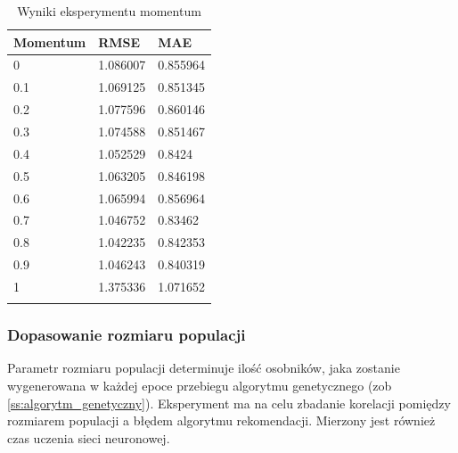 \documentclass[twoside]{iisthesis}
\begin{document}
		\begin{longtable}{l||ll}
			\label{tab:expmomentum}
			\textbf{Momentum} & \textbf{RMSE} & \textbf{MAE} \\
			\hline
			0        & 1.086007 & 0.855964 \\
			0.1      & 1.069125 & 0.851345 \\
			0.2      & 1.077596 & 0.860146 \\
			0.3      & 1.074588 & 0.851467 \\
			0.4      & 1.052529 & 0.8424   \\
			0.5      & 1.063205 & 0.846198 \\
			0.6      & 1.065994 & 0.856964 \\
			0.7      & 1.046752 & 0.83462  \\
			0.8      & 1.042235 & 0.842353 \\
			0.9      & 1.046243 & 0.840319 \\
			1        & 1.375336 & 1.071652 \\
			\caption{Wyniki eksperymentu momentum}
		\end{longtable}
					
		\subsubsection{Dopasowanie rozmiaru populacji}
	
		Parametr rozmiaru populacji determinuje ilość osobników, jaka zostanie wygenerowana w każdej epoce przebiegu algorytmu genetycznego (zob \ref{ss:algorytm_genetyczny}). Eksperyment ma na celu zbadanie korelacji pomiędzy rozmiarem populacji a błędem algorytmu rekomendacji. Mierzony jest również czas uczenia sieci neuronowej.
		
\end{document}
